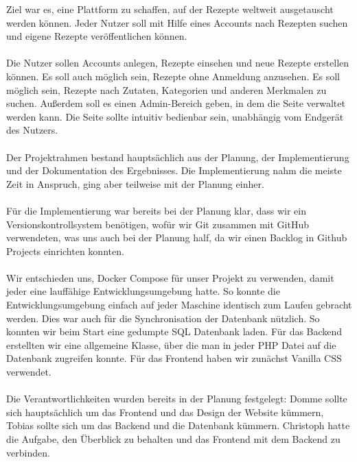 \documentclass{article}
\begin{document}
Ziel war es, eine Plattform zu schaffen, auf der Rezepte weltweit ausgetauscht werden können. Jeder Nutzer soll mit Hilfe eines Accounts nach Rezepten suchen und eigene Rezepte veröffentlichen können.\\
\\
Die Nutzer sollen Accounts anlegen, Rezepte einsehen und neue Rezepte erstellen können.
Es soll auch möglich sein, Rezepte ohne Anmeldung anzusehen.
Es soll möglich sein, Rezepte nach Zutaten, Kategorien und anderen Merkmalen zu suchen.
Außerdem soll es einen Admin-Bereich geben, in dem die Seite verwaltet werden kann.
Die Seite sollte intuitiv bedienbar sein, unabhängig vom Endgerät des Nutzers.\\
\\
Der Projektrahmen bestand hauptsächlich aus der Planung, der Implementierung und der Dokumentation des Ergebnisses. Die Implementierung nahm die meiste Zeit in Anspruch, ging aber teilweise mit der Planung einher.\\
\\
Für die Implementierung war bereits bei der Planung klar, dass wir ein Versionskontrollsystem benötigen, wofür wir Git zusammen mit GitHub verwendeten, was uns auch bei der Planung half, da wir einen Backlog in Github Projects einrichten konnten.\\
\\
Wir entschieden uns, Docker Compose für unser Projekt zu verwenden, damit jeder eine lauffähige Entwicklungsumgebung hatte. So konnte die Entwicklungsumgebung einfach auf jeder Maschine identisch zum Laufen gebracht werden.
Dies war auch für die Synchronisation der Datenbank nützlich. So konnten wir beim Start eine gedumpte SQL Datenbank laden.
Für das Backend erstellten wir eine allgemeine Klasse, über die man in jeder PHP Datei auf die Datenbank zugreifen konnte. Für das Frontend haben wir zunächst Vanilla CSS verwendet.\\
\\
Die Verantwortlichkeiten wurden bereits in der Planung festgelegt:
Domme sollte sich hauptsächlich um das Frontend und das Design der Website kümmern,
Tobias sollte sich um das Backend und die Datenbank kümmern.
Christoph hatte die Aufgabe, den Überblick zu behalten und das Frontend mit dem Backend zu verbinden.\\

\pagebreak
\end{document}
